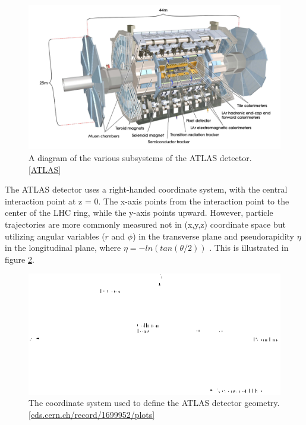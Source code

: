\begin{figure}
  \includegraphics[width=\linewidth]{figures/detector_chapter/ATLAS.png}
  \caption{A diagram of the various subsystems of the ATLAS detector. \ref{ATLAS}}
  \label{fig:ATLAS}
\end{figure}

	The ATLAS detector uses a right-handed coordinate system, with the central interaction point at z = 0. The x-axis points from the interaction point to the center of the LHC ring, while the y-axis points upward. However, particle trajectories are more commonly measured not in (x,y,z) coordinate space but utilizing angular variables ($r$ and $\phi$) in the transverse plane and pseudorapidity $ \eta $ in the longitudinal plane, where $ \eta = -ln(tan( \theta /2) ) $ . This is illustrated in figure \ref{fig:coords}.

\begin{figure}
  \includegraphics[width=\linewidth]{figures/detector_chapter/coords.png}
  \caption{The coordinate system used to define the ATLAS detector geometry. \ref{cds.cern.ch/record/1699952/plots}}
  \label{fig:coords}
\end{figure}


